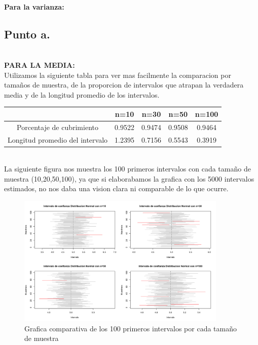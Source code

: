 \documentclass[letterpaper,12pt,onecolumn,titlepage]{article}
\begin{document}
~\\ \textbf{Para la varianza:}
\subsection{Punto a.}
~\\ \textbf{PARA LA MEDIA:}
~\\ Utilizamos la siguiente tabla para ver mas facilmente la comparacion por tama\~{n}os de muestra, de la proporcion de intervalos que atrapan la verdadera media y de la longitud promedio de los intervalos.
\begin{center}
\begin{tabular}{|c|c|c|c|c|}
\hline 
\rule[-1ex]{0pt}{2.5ex}  & n=10 & n=30 & n=50 & n=100 \\ 
\hline 
\rule[-1ex]{0pt}{2.5ex} Porcentaje de cubrimiento & 0.9522 & 0.9474 & 0.9508 & 0.9464 \\ 
\hline 
\rule[-1ex]{0pt}{2.5ex} Longitud promedio del intervalo & 1.2395 & 0.7156 & 0.5543 & 0.3919 \\ 
\hline 
\end{tabular} 
\end{center}

~\\ \pagebreak La siguiente figura nos muestra los 100 primeros intervalos con cada tama\~{n}o de muestra (10,20,50,100), ya que si elaborabamos la grafica con los 5000 intervalos estimados, no nos daba una vision clara ni comparable de lo que ocurre. 
~\\ \begin{figure}[!h]
    \begin{center}
        \includegraphics[width=10cm]{Figuras/Punto1.png}
        \caption{Grafica comparativa de los 100 primeros intervalos por cada tama\~{n}o de muestra}
        \label{fig:Densidad}
    \end{center}
\end{figure}
\end{document}
